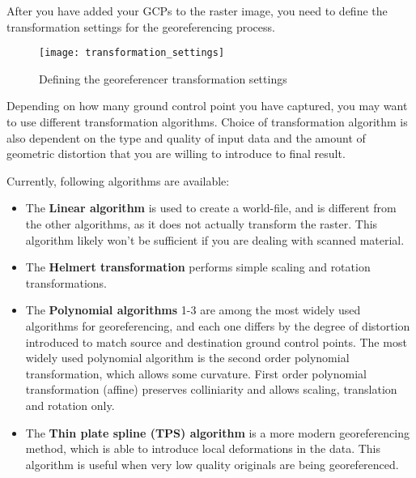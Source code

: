 \label{georeferencer_transformation}

After you have added your GCPs to the raster image, you need to define the 
transformation settings for the georeferencing process. 

\begin{figure}[ht]
\centering
  \texttt{[image: transformation\_settings]}
  \caption{Defining the georeferencer transformation settings \nixcaption}\label{fig:georef_transform}
\end{figure}


Depending on how many ground control point you have captured, you may want 
to use different transformation algorithms. Choice of transformation 
algorithm is also dependent on the type and quality of input data and 
the amount of geometric distortion that you are willing to introduce 
to final result.

Currently, following algorithms are available: 

\begin{itemize}[label=--]
\item The \textbf{Linear algorithm} is used to create a world-file, and is different 
from the other algorithms, as it does not actually transform the raster. 
This algorithm likely won't be sufficient if you are dealing with scanned 
material.
\item The \textbf{Helmert transformation} performs simple scaling and rotation 
transformations. 
\item The \textbf{Polynomial algorithms} 1-3 are among the most widely 
used algorithms 
for georeferencing, and each one differs by the degree of distortion 
introduced to match source and destination ground control points. The 
most widely used polynomial algorithm is the second order polynomial 
transformation, which allows some curvature. First order polynomial 
transformation (affine) preserves colliniarity and allows scaling, 
translation and rotation only.
\item The \textbf{Thin plate spline (TPS) algorithm} is a more 
modern georeferencing  method, which is able to introduce local 
deformations in the data. This algorithm is useful when very low 
quality originals are being georeferenced.
\end{itemize}


